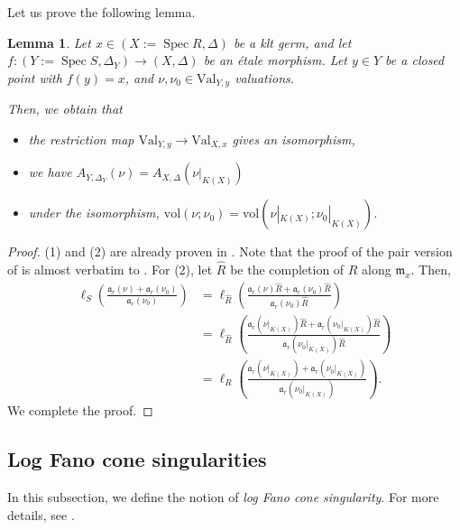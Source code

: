 \documentclass[a4paper,12pt]{amsart}
\newtheorem{lemma}[theorem]{Lemma}
\theoremstyle{definition} %
\theoremstyle{remark}
\numberwithin{equation}{section}
\def\Spec{\operatorname{Spec}}
\begin{document}
Let us prove the following lemma.

\begin{lemma} \label{HLQ}
Let $x\in (X:=\Spec R,\Delta)$ be a klt germ, and let $f:(Y:=\Spec S,\Delta_Y)\to (X,\Delta)$ be an étale morphism. Let $y\in Y$ be a closed point with $f(y)=x$, and $\nu,\nu_0\in \mathrm{Val}_{Y,y}$ valuations.

\smallskip

Then, we obtain that
\begin{itemize}
    \item[(1)] the restriction map $\mathrm{Val}_{Y,y}\to \mathrm{Val}_{X,x}$ gives an isomorphism,
    \item[(2)] we have $A_{Y,\Delta_Y}(\nu)=A_{X,\Delta}(\nu|_{K(X)})$
    \item[(3)] under the isomorphism, $\mathrm{vol}(\nu;\nu_0)=\mathrm{vol}(\nu|_{K(X)};\nu_0|_{K(X)})$.
\end{itemize}
\end{lemma}

\begin{proof}
(1) and (2) are already proven in \cite[Proposition 2.24]{HLQ23}. Note that the proof of the pair version of \cite[Proposition 2.24 (1)]{HLQ23} is almost verbatim to \cite[The proof of Proposition 2.24 (1)]{HLQ23}. For (2), let $\widehat{R}$ be the completion of $R$ along $\mathfrak{m}_x$. Then,
$$
\begin{aligned}
\ell_S\left(\frac{\mathfrak{a}_r(\nu)+\mathfrak{a}_r(\nu_0)}{\mathfrak{a}_r(\nu_0)}\right)&=\ell_{\widehat{R}}\left(\frac{\mathfrak{a}_r(\nu)\widehat{R}+\mathfrak{a}_r(\nu_0)\widehat{R}}{\mathfrak{a}_r(\nu_0)\widehat{R}}\right)
\\ &=\ell_{\widehat{R}}\left(\frac{\mathfrak{a}_r(\nu|_{K(X)})\widehat{R}+\mathfrak{a}_r(\nu_0|_{K(X)})\widehat{R}}{\mathfrak{a}_r(\nu_0|_{K(X)})\widehat{R}}\right)
\\ &=\ell_R\left(\frac{\mathfrak{a}_r(\nu|_{K(X)})+\mathfrak{a}_r(\nu_0|_{K(X)})}{\mathfrak{a}_r(\nu_0|_{K(X)})}\right).
\end{aligned}
$$
We complete the proof.
\end{proof}

\subsection{Log Fano cone singularities}
In this subsection, we define the notion of \emph{log Fano cone singularity}. For more details, see \cite{Zhu24, Liu26}.
\end{document}
